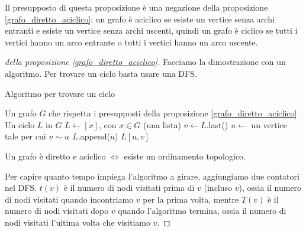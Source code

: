 Il presupposto di questa proposizione \`e una negazione della proposizione \ref{grafo_diretto_aciclico}: un grafo \`e aciclico se esiste un vertice senza archi entranti e esiste un vertice senza archi uscenti, quindi un grafo \`e ciclico se tutti i vertici hanno un arco entrante o tutti i vertici hanno un arco uscente. 

\begin{proof}[della proposizione \ref{grafo_diretto_aciclico}]
Facciamo la dimostrazione con un algoritmo. Per trovare un ciclo basta usare una DFS.

\begin{algorithm}
\caption{Algoritmo per trovare un ciclo}
\begin{algorithmic}[1]
\Require Un grafo $G$ che rispetta i presupposti della proposizione \ref{grafo_diretto_aciclico}
\Ensure Un ciclo $L$ in $G$
\State $L \gets [x]$, con $x \in G$ (una lista)
    \State $v \gets L$.last()
    \State $u \gets $ un vertice tale per cui $v \sim u$
        \State $L$.append($u$)
    \EndIf
\EndWhile
\State \Return $L[u, v]$
\end{algorithmic}
\end{algorithm}

Un grafo \`e diretto e aciclico $\iff$ esiste un ordinamento topologico.

Per capire quanto tempo impiega l'algoritmo a girare, aggiungiamo due contatori nel DFS. $t(v)$ \`e il numero di nodi visitati prima di $v$ (incluso $v$), ossia il numero di nodi visitati quando incontriamo $v$ per la prima volta, mentre $T(v)$ \`e il numero di nodi visitati dopo $v$ quando l'algoritmo termina, ossia il numero di nodi visitati l'ultima volta che visitiamo $v$.
\end{proof}

